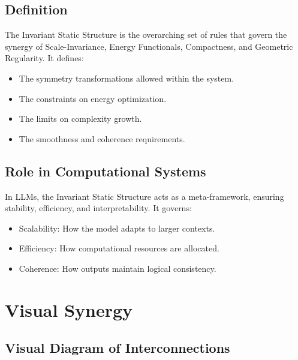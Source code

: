 \documentclass[12pt]{article}
\begin{document}
\subsection{Definition}
The Invariant Static Structure is the overarching set of rules that govern the synergy of Scale-Invariance, Energy Functionals, Compactness, and Geometric Regularity. It defines:
\begin{itemize}
    \item The symmetry transformations allowed within the system.
    \item The constraints on energy optimization.
    \item The limits on complexity growth.
    \item The smoothness and coherence requirements.
\end{itemize}

\subsection{Role in Computational Systems}
In LLMs, the Invariant Static Structure acts as a meta-framework, ensuring stability, efficiency, and interpretability. It governs:
\begin{itemize}
    \item Scalability: How the model adapts to larger contexts.
    \item Efficiency: How computational resources are allocated.
    \item Coherence: How outputs maintain logical consistency.
\end{itemize}

\section{Visual Synergy}
\subsection{Visual Diagram of Interconnections}
\begin{center}
\end{center}
\end{document}
